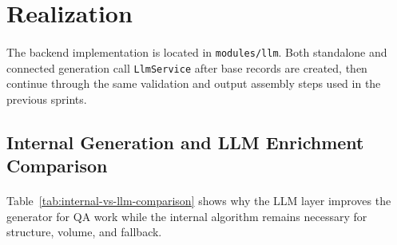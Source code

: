 \section{Realization}

\paragraph{}The backend implementation is located in \texttt{modules/llm}. Both standalone and connected
generation call \texttt{LlmService} after base records are created, then continue through the same
validation and output assembly steps used in the previous sprints.

\subsection{Internal Generation and LLM Enrichment Comparison}

\paragraph{}Table~\ref{tab:internal-vs-llm-comparison} shows why the LLM layer improves the
generator for QA work while the internal algorithm remains necessary for structure, volume, and
fallback.

